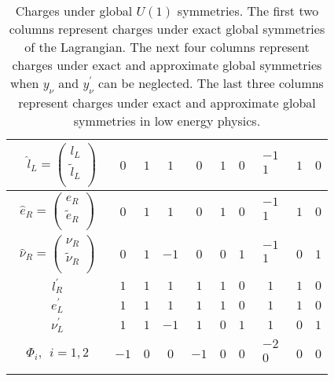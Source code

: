 \documentclass[prd,showpcs,amsmath,amssymb,nofootinbib,preprintnumbers,balancelastpage,longbibliography,superscriptaddress,notitlepage]{revtex4}
\begin{document}
{\begin{table*}[t!]
\begin{center}
\begin{tabular}{| c || c | c | c || c | c | c || c | c | c |}
       \\ \hline\hline
         \ \ $\hat{l}_{L} =  \left(\!\begin{array}{c}
    l_L\\
    \tilde{l}_L \\
  \end{array} \!\right) \ \ $ & $0$ & $1$ & $1$ & $0$  & $1$ & $0$ & $\!\begin{array}{c} -1\\ 1 \\ \end{array}$  & $1$ & $0$ \\ \hline
         $\hat{e}_R =  \left(\!\!\begin{array}{c}
    e_R\\
    \tilde{e}_R \\
  \end{array} \!\!\right)$ & $0$ & $1$ & $1$ & $0$  & $1$ & $0$ & $\!\begin{array}{c} -1\\ 1 \\ \end{array}$ & $1$ & $0$ \\ \hline
          $\hat{\nu}_R = \left(\!\!\begin{array}{c}
    \nu_R\\
    \tilde{\nu}_R \\
  \end{array} \!\!\right)$ & $0$ & $1$ & $-1$ & $0$  & $0$ & $1$ & $\!\begin{array}{c} -1\\ 1 \\ \end{array}$ & $0$ & $1$ \\ \hline
               $l^\prime_{R}$ & $1$ & $1$ & $1$ & $1$ & $1$ & $0$ & $1$ & $1$ & $0$ \\ \hline
         $e^\prime_L$ & $1$ & $1$ & $1$ & $1$ & $1$ & $0$ & $1$ & $1$ & $0$ \\ \hline
          $\nu^\prime_L$ & $1$ & $1$ & $-1$ & $1$ & $0$ & $1$ & $1$ & $0$ & $1$ \\ \hline
         $\Phi_i,~~i=1,2$ & $-1$ & $0$ & $0$ & $-1$ & $0$ & $0$  & $\!\begin{array}{c} -2\\ 0 \\ \end{array}$ & $0$ & $0$ \\ \hline
    \end{tabular}
\end{center}
\caption{\small{Charges under global $U(1)$ symmetries. The first two columns represent charges under exact global symmetries of the Lagrangian. The next four columns represent charges under exact and approximate global symmetries when $y_\nu$ and $y_\nu^\prime$ can be neglected. The last three columns represent charges under exact and approximate global symmetries in low energy physics.}}
\label{tab:global}
\end{table*}}
\end{document}
